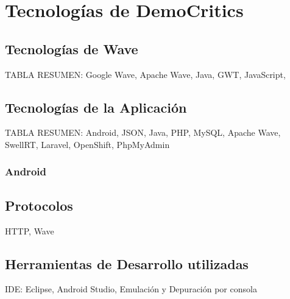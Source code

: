 \newpage
\thispagestyle{sectioned}
\chapter{Tecnologías de DemoCritics}
 
\section{Tecnologías de Wave}

  TABLA RESUMEN: Google Wave, Apache Wave, Java, GWT, JavaScript, 

\section{Tecnologías de la Aplicación}
  
  TABLA RESUMEN: Android, JSON, Java, PHP, MySQL, Apache Wave, SwellRT, Laravel, OpenShift, PhpMyAdmin 
    
    \subsection{Android}
  
  
\section{Protocolos} 

  HTTP, Wave
  
\section{Herramientas de Desarrollo utilizadas}

  IDE: Eclipse, Android Studio, Emulación y Depuración por consola 

